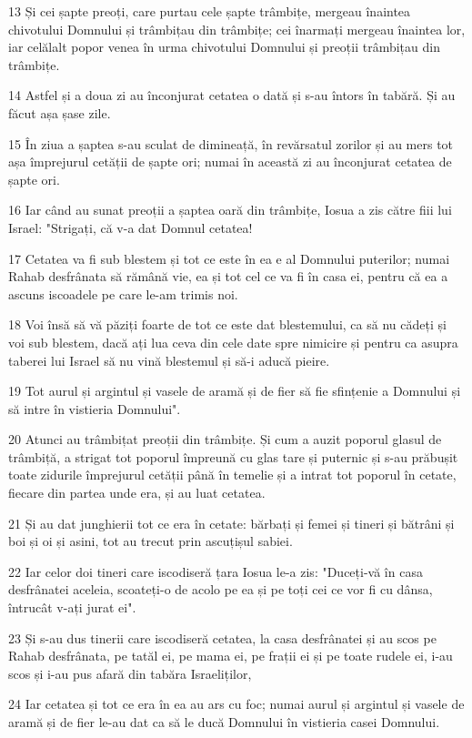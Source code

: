 \par 13 Și cei șapte preoți, care purtau cele șapte trâmbițe, mergeau înaintea chivotului Domnului și trâmbițau din trâmbițe; cei înarmați mergeau înaintea lor, iar celălalt popor venea în urma chivotului Domnului și preoții trâmbițau din trâmbițe.
\par 14 Astfel și a doua zi au înconjurat cetatea o dată și s-au întors în tabără. Și au făcut așa șase zile.
\par 15 În ziua a șaptea s-au sculat de dimineață, în revărsatul zorilor și au mers tot așa împrejurul cetății de șapte ori; numai în această zi au înconjurat cetatea de șapte ori.
\par 16 Iar când au sunat preoții a șaptea oară din trâmbițe, Iosua a zis către fiii lui Israel: "Strigați, că v-a dat Domnul cetatea!
\par 17 Cetatea va fi sub blestem și tot ce este în ea e al Domnului puterilor; numai Rahab desfrânata să rămână vie, ea și tot cel ce va fi în casa ei, pentru că ea a ascuns iscoadele pe care le-am trimis noi.
\par 18 Voi însă să vă păziți foarte de tot ce este dat blestemului, ca să nu cădeți și voi sub blestem, dacă ați lua ceva din cele date spre nimicire și pentru ca asupra taberei lui Israel să nu vină blestemul și să-i aducă pieire.
\par 19 Tot aurul și argintul și vasele de aramă și de fier să fie sfințenie a Domnului și să intre în vistieria Domnului".
\par 20 Atunci au trâmbițat preoții din trâmbițe. Și cum a auzit poporul glasul de trâmbiță, a strigat tot poporul împreună cu glas tare și puternic și s-au prăbușit toate zidurile împrejurul cetății până în temelie și a intrat tot poporul în cetate, fiecare din partea unde era, și au luat cetatea.
\par 21 Și au dat junghierii tot ce era în cetate: bărbați și femei și tineri și bătrâni și boi și oi și asini, tot au trecut prin ascuțișul sabiei.
\par 22 Iar celor doi tineri care iscodiseră țara Iosua le-a zis: "Duceți-vă în casa desfrânatei aceleia, scoateți-o de acolo pe ea și pe toți cei ce vor fi cu dânsa, întrucât v-ați jurat ei".
\par 23 Și s-au dus tinerii care iscodiseră cetatea, la casa desfrânatei și au scos pe Rahab desfrânata, pe tatăl ei, pe mama ei, pe frații ei și pe toate rudele ei, i-au scos și i-au pus afară din tabăra Israeliților,
\par 24 Iar cetatea și tot ce era în ea au ars cu foc; numai aurul și argintul și vasele de aramă și de fier le-au dat ca să le ducă Domnului în vistieria casei Domnului.
